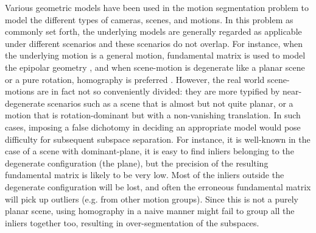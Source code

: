 \documentclass[10pt,twocolumn,letterpaper]{article}
\begin{document}
Various geometric models have been used in the motion segmentation problem to model the different types of cameras, scenes, and motions. In this problem as commonly set forth, the underlying models are generally regarded as applicable under different scenarios and these scenarios do not overlap. For instance, when the underlying motion is a general motion, fundamental matrix is used to model the epipolar geometry \cite{Jung2014,Li2013}, and when scene-motion is degenerate like a planar scene or a pure rotation, homography is preferred \cite{Dragon2012,Lai2017}. However, the real world scene-motions are in fact not so conveniently divided: they are more typified by near-degenerate scenarios such as a scene that is almost but not quite planar, or a motion that is rotation-dominant but with a non-vanishing translation. In such cases, imposing a false dichotomy in deciding an appropriate model would pose difficulty for subsequent subspace separation. For instance, it is well-known \cite{Goshen2008,sugaya2004geometric,Torr1998} in the case of a scene with dominant-plane, it is easy to find inliers belonging to the degenerate configuration (the plane), but the precision of the resulting fundamental matrix is likely to be very low. Most of the inliers outside the degenerate configuration will be lost, and often the erroneous fundamental matrix will pick up outliers (e.g. from other motion groups). Since this is not a purely planar scene, using homography in a naive manner might fail to group all the inliers together too, resulting in over-segmentation of the subspaces. 
\end{document}

